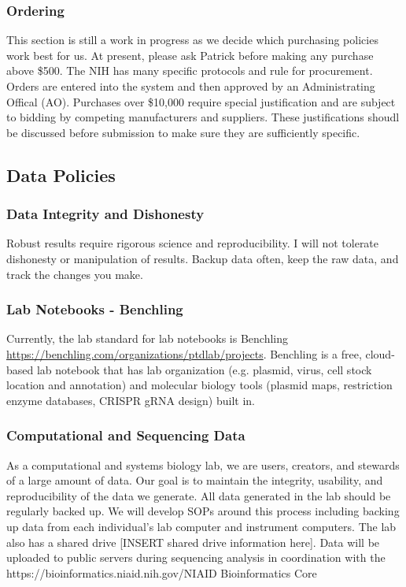 \documentclass[10pt, a4paper, twocolumn]{article} %
\begin{document}
\subsubsection{Ordering}
 This section is still a work in progress as we decide which purchasing policies work best for us. At present, please ask Patrick before making any purchase above \$500. The NIH has many specific protocols and rule for procurement. Orders are entered into the system and then approved by an Administrating Offical (AO). Purchases over \$10,000 require special justification and are subject to bidding by competing manufacturers and suppliers. These justifications shoudl be discussed before submission to make sure they are sufficiently specific.

\subsection{Data Policies}
\subsubsection{Data Integrity and Dishonesty}
Robust results require rigorous science and reproducibility. I will not tolerate dishonesty or manipulation of results. Backup data often, keep the raw data, and track the changes you make.

\subsubsection{Lab Notebooks - Benchling}
Currently, the lab standard for lab notebooks is Benchling \href{https://benchling.com/organizations/ptdlab/projects}{https://benchling.com/organizations/ptdlab/projects}. Benchling is a free, cloud-based lab notebook that has lab organization (e.g. plasmid, virus, cell stock location and annotation) and molecular biology tools (plasmid maps, restriction enzyme databases, CRISPR gRNA design) built in.

\subsubsection{Computational and Sequencing Data}
As a computational and systems biology lab, we are users, creators, and stewards of a large amount of data. Our goal is to maintain the integrity, usability, and reproducibility of the data we generate. All data generated in the lab should be regularly backed up. We will develop SOPs around this process including backing up data from each individual's lab computer and instrument computers. The lab also has a shared drive [INSERT shared drive information here]. Data will be uploaded to public servers during sequencing analysis in coordination with the {https://bioinformatics.niaid.nih.gov/}{NIAID Bioinformatics Core}
\end{document}
